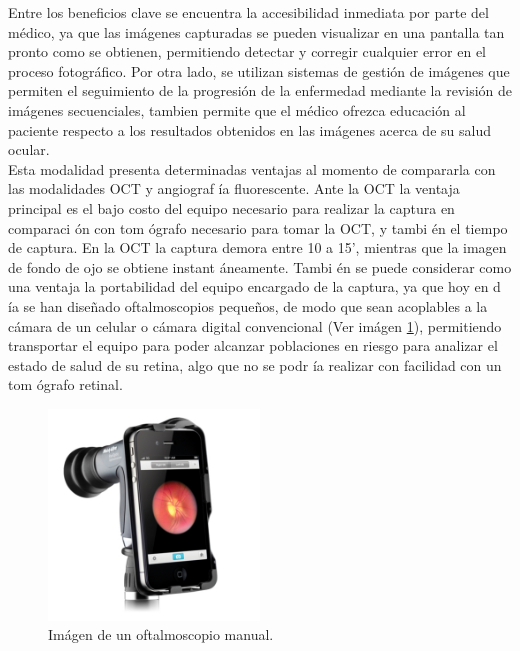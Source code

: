 Entre los beneficios clave se encuentra la accesibilidad inmediata por parte del m\'edico, ya que las im\'agenes capturadas se pueden visualizar en una pantalla tan pronto como se obtienen, permitiendo detectar y corregir cualquier error en el proceso fotogr\'afico. Por otra lado, se utilizan sistemas de gesti\'on de im\'agenes que permiten el seguimiento de la progresi\'on de la enfermedad mediante la revisi\'on de im\'agenes secuenciales, tambien permite que el m\'edico ofrezca educaci\'on al paciente respecto a los resultados obtenidos en las im\'agenes acerca de su salud ocular. \cite{cunha2004blood}\\
Esta modalidad presenta determinadas ventajas al momento de compararla con las modalidades OCT y angiograf \'ia fluorescente. 
Ante la OCT la ventaja principal es el bajo costo del equipo necesario para realizar la captura en comparaci \'on con tom \'ografo necesario para tomar la OCT, y tambi \'en el tiempo de captura. En la OCT la captura demora entre 10 a 15’, mientras que la imagen de fondo de ojo se obtiene instant \'aneamente. Tambi \'en se puede considerar como una ventaja la portabilidad del equipo encargado de la captura, ya que hoy en d \'ia se han diseñado oftalmoscopios peque\~nos, de modo que sean acoplables a la c\'amara de un celular o c\'amara digital convencional (Ver im\'agen \ref{fig:OftalmoscopioManual}), permitiendo transportar el equipo para poder alcanzar poblaciones en riesgo para analizar el estado de salud de su retina, algo que no se podr \'ia realizar con facilidad con un tom \'ografo retinal.

\begin{figure}[H]
	{
	\centering
	\includegraphics[width=0.5\textwidth]{Figures/oftalmoscopioManual}
	\caption[Ofaltmosocpio Manual]{Im\'agen de un oftalmoscopio manual.}
	\label{fig:OftalmoscopioManual}
	}
\end{figure}

